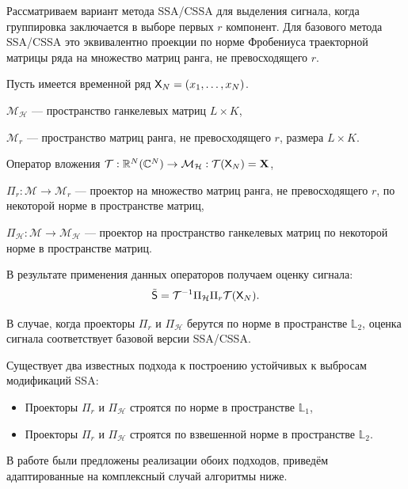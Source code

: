 \documentclass[specialist,
               substylefile = spbu.rtx,
               subf,href,colorlinks=true, 12pt]{disser}
\begin{document}

Рассматриваем вариант метода SSA/CSSA для выделения сигнала, когда группировка заключается в выборе первых $r$ компонент. Для базового метода SSA/CSSA это эквивалентно проекции по норме Фробениуса траекторной матрицы ряда на множество матриц ранга, не превосходящего $r$.

Пусть имеется временной ряд $\textsf{X}_N=(x_1, \ldots, x_{N})$.

$\mathcal{M}_{\mathcal{H}}$ --- пространство ганкелевых матриц $L\times K$,

$\mathcal{M}_{r}$ --- пространство матриц ранга, не превосходящего $r$, размера $L \times K$.

Оператор вложения $\mathcal{T}:\mathbb{R}^N(\mathbb{C}^N) \rightarrow \mathcal{M}_{\mathcal{H}}: \mathcal{T} (\textsf{X}_N) = \mathbf{X} $,

$\Pi_{r}:\mathcal{M}\rightarrow \mathcal{M}_r$ --- проектор на множество матриц ранга, не превосходящего $r$, по некоторой норме в пространстве матриц,

$\Pi_{\mathcal{H}}:\mathcal{M} \rightarrow \mathcal{M}_{\mathcal{H}}$ --- проектор на пространство ганкелевых матриц по некоторой норме в пространстве матриц.

В результате применения данных операторов получаем оценку сигнала:
\begin{equation*}
	\tilde{\textsf{S}} = \mathcal{T}^{-1} \Pi_{\mathcal{H}} \Pi_{r} \mathcal{T} (\textsf{X}_N).
\end{equation*}

В случае, когда проекторы $\Pi_r$ и $\Pi_{\mathcal{H}}$ берутся по норме в пространстве $\mathbb{L}_2$, оценка сигнала соответствует базовой версии SSA/CSSA.

Существует два известных подхода к построению устойчивых к выбросам модификаций SSA:

\begin{itemize}
	\item Проекторы $ \Pi_{r}$ и $\Pi_{\mathcal{H}} $ строятся по норме в пространстве $\mathbb{L}_1$,
	\item Проекторы $ \Pi_{r}$ и $\Pi_{\mathcal{H}} $ строятся по взвешенной норме в пространстве $\mathbb{L}_2$.
\end{itemize}

В работе \cite{Tretyakova20} были предложены реализации обоих подходов, приведём адаптированные на комплексный случай алгоритмы ниже.
\end{document}
